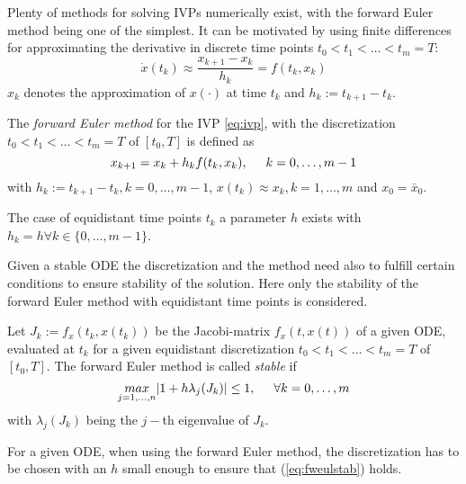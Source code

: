 \documentclass[a4paper, 12pt]{scrreprt} %
\begin{document}
Plenty of methods for solving \acp{IVP} numerically exist, with the forward Euler method being one of the simplest. It can be motivated by using finite differences for approximating the derivative in discrete time points $t_0 < t_1 < \dots < t_m = T$:
\begin{equation*}
\dot x(t_k) \approx \frac{x_{k+1}- x_k}{h_k} = f(t_k, x_k) 
\end{equation*}
$x_k$ denotes the approximation of $x(\cdot)$ at time $t_k$ and $h_k := t_{k+1}-t_k$.

\begin{definition}
The \emph{forward Euler method} for the \ac{IVP} \ref{eq:ivp}, with the discretization $t_0 < t_1 < \dots < t_m = T$ of $[t_0,T]$ is defined as
\begin{equation}
x_{k+1} = x_k + h_k f(t_k,x_k), \hspace{0.5cm} k=0,\dots, m-1
\label{eq:fweul}
\end{equation}
with $h_k := t_{k+1}-t_k, k=0,\dots,m-1$, $x(t_k) \approx x_k, k=1,\dots,m$ and $x_0 = \bar x_0$. 
\end{definition}

The case of equidistant time points $t_k$ a parameter $h$ exists with $h_k = h \forall k \in \{0,\dots,m-1\}$. 

Given a stable \ac{ODE} the discretization and the method need also to fulfill certain conditions to ensure stability of the solution. Here only the stability of the forward Euler method with equidistant time points is considered.

\begin{definition}
Let $J_k := f_x(t_k,x(t_k))$ be the Jacobi-matrix $f_x(t,x(t))$ of a given \ac{ODE}, evaluated at $t_k$ for a given equidistant discretization $t_0 < t_1 < \dots < t_m = T$ of $[t_0,T]$. The forward Euler method is called \emph{stable} if
\begin{equation}
\underset{j=1,\dots,n}{max} \vert 1+h\lambda_j(J_k) \vert \leq 1 ,\hspace{0.5cm} \forall k=0,\dots,m
\label{eq:fweulstab}
\end{equation}
with $\lambda_j(J_k)$ being the $j-$th eigenvalue of $J_k$.
\end{definition}

For a given \ac{ODE}, when using the forward Euler method, the discretization has to be chosen with an $h$ small enough to ensure that (\ref{eq:fweulstab}) holds.
\end{document}
